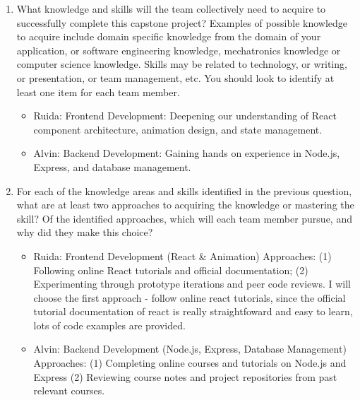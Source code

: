 \begin{enumerate}
  \item What knowledge and skills will the team collectively need to acquire to
  successfully complete this capstone project?  Examples of possible knowledge
  to acquire include domain specific knowledge from the domain of your
  application, or software engineering knowledge, mechatronics knowledge or
  computer science knowledge.  Skills may be related to technology, or writing,
  or presentation, or team management, etc.  You should look to identify at
  least one item for each team member.
\begin{itemize}

\item Ruida: Frontend Development: Deepening our understanding of React component architecture, animation design, and state management.
\item Alvin: Backend Development: Gaining hands on experience in Node.js, Express, and database management.
\end{itemize}
  \item For each of the knowledge areas and skills identified in the previous
  question, what are at least two approaches to acquiring the knowledge or
  mastering the skill?  Of the identified approaches, which will each team
  member pursue, and why did they make this choice?
	\begin{itemize}
	\item Ruida: Frontend Development (React \& Animation)
	Approaches: (1) Following online React tutorials and official documentation; (2) Experimenting through prototype 	iterations and peer code reviews. I will choose the first approach - follow online react tutorials,  since the official tutorial documentation of react is really straightfoward and easy to learn, lots of code examples are provided.
	\end{itemize}
  \begin{itemize}
  \item Alvin: Backend Development (Node.js, Express, Database Management)
  Approaches: (1) Completing online courses and tutorials on Node.js and Express (2) Reviewing course notes and project repositories from past relevant courses.
  \end{itemize}
\end{enumerate}
